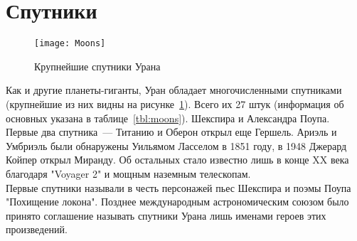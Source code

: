 \documentclass[30pt]{article}
\begin{document}
    \section{Спутники}
        \begin{figure}[h!]
            \centering
            \texttt{[image: Moons]}
            \caption{Крупнейшие спутники Урана}
            \label{pic:moons}
        \end{figure}
        Как и другие планеты-гиганты, Уран обладает многочисленными спутниками (крупнейшие из них видны на рисунке~\ref{pic:moons}). Всего их 27 штук (информация об основных указана в таблице~\ref{tbl:moons}). Шекспира и Александра Поупа. Первые два спутника~--- Титанию и Оберон открыл еще Гершель. Ариэль и Умбриэль были обнаружены Уильямом Ласселом в 1851 году, в 1948 Джерард Койпер открыл Миранду. Об остальных стало известно лишь в конце XX века благодаря "Voyager 2" и мощным наземным телескопам.\\
        Первые спутники называли в честь персонажей пьес Шекспира и поэмы Поупа "Похищение локона". Позднее международным астрономическим союзом было принято соглашение называть спутники Урана лишь именами героев этих произведений.\\
\end{document}
